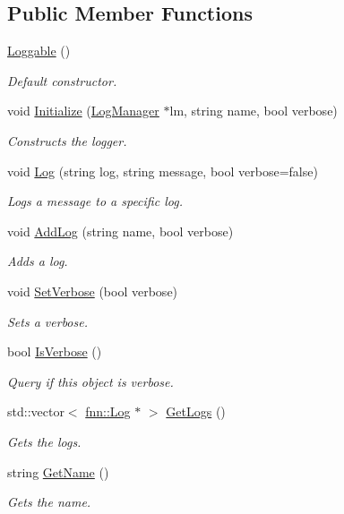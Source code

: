 \subsection*{Public Member Functions}
\begin{DoxyCompactItemize}
\item 
\hyperlink{classfnn_1_1_loggable_a81f34c1fc8476ac4219c2ddb01c222d0}{Loggable} ()
\begin{DoxyCompactList}\small\item\em Default constructor. \end{DoxyCompactList}\item 
void \hyperlink{classfnn_1_1_loggable_a28a792b13dc2e4537bab2dbe7ff8a307}{Initialize} (\hyperlink{classfnn_1_1_log_manager}{Log\+Manager} $\ast$lm, string name, bool verbose)
\begin{DoxyCompactList}\small\item\em Constructs the logger. \end{DoxyCompactList}\item 
void \hyperlink{classfnn_1_1_loggable_a2e3828f6cf6e21652b12968bf44a78c5}{Log} (string log, string message, bool verbose=false)
\begin{DoxyCompactList}\small\item\em Logs a message to a specific log. \end{DoxyCompactList}\item 
void \hyperlink{classfnn_1_1_loggable_a117c6293cf156586db28af4c5d2515d1}{Add\+Log} (string name, bool verbose)
\begin{DoxyCompactList}\small\item\em Adds a log. \end{DoxyCompactList}\item 
void \hyperlink{classfnn_1_1_loggable_a01d0d53a2d3ae448050b0e1b1c159d65}{Set\+Verbose} (bool verbose)
\begin{DoxyCompactList}\small\item\em Sets a verbose. \end{DoxyCompactList}\item 
bool \hyperlink{classfnn_1_1_loggable_a6d86a105bbc849acbfc43955b224af06}{Is\+Verbose} ()
\begin{DoxyCompactList}\small\item\em Query if this object is verbose. \end{DoxyCompactList}\item 
std\+::vector$<$ \hyperlink{classfnn_1_1_log}{fnn\+::\+Log} $\ast$ $>$ \hyperlink{classfnn_1_1_loggable_ac067f3c5dcae780333636567844e0533}{Get\+Logs} ()
\begin{DoxyCompactList}\small\item\em Gets the logs. \end{DoxyCompactList}\item 
string \hyperlink{classfnn_1_1_loggable_a9b478a42733f406508f6ef47c4fffdf7}{Get\+Name} ()
\begin{DoxyCompactList}\small\item\em Gets the name. \end{DoxyCompactList}\end{DoxyCompactItemize}


